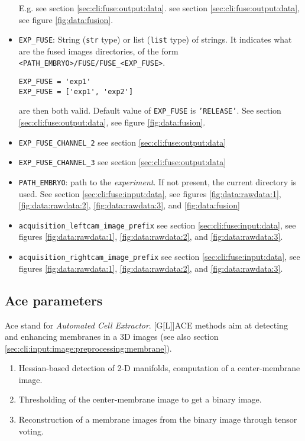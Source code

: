 \begin{itemize}
  E.g. see section \ref{sec:cli:fuse:output:data}.
see section \ref{sec:cli:fuse:output:data},
see figure \ref{fig:data:fusion}.
\item \texttt{EXP\_FUSE}:
  String (\texttt{str} type) or list (\texttt{list} type) of
  strings. It indicates what are the fused images directories, 
  of the form \texttt{<PATH\_EMBRYO>/FUSE/FUSE\_<EXP\_FUSE>}.
\begin{verbatim}
EXP_FUSE = 'exp1'
EXP_FUSE = ['exp1', 'exp2']
\end{verbatim}
  are then both valid. 
  Default value of \texttt{EXP\_FUSE} is \texttt{'RELEASE'}.
  See section \ref{sec:cli:fuse:output:data},
  see figure \ref{fig:data:fusion}.
\item \texttt{EXP\_FUSE\_CHANNEL\_2} 
see section \ref{sec:cli:fuse:output:data}
\item \texttt{EXP\_FUSE\_CHANNEL\_3} 
see section \ref{sec:cli:fuse:output:data}
\item \texttt{PATH\_EMBRYO}: 
  path to the \textit{experiment}.
  If not present, the current directory is used.
  See section \ref{sec:cli:fuse:input:data},
  see figures \ref{fig:data:rawdata:1}, 
\ref{fig:data:rawdata:2}, 
\ref{fig:data:rawdata:3}, and
\ref{fig:data:fusion}
\item \texttt{acquisition\_leftcam\_image\_prefix}  
see section \ref{sec:cli:fuse:input:data},
see figures \ref{fig:data:rawdata:1}, 
\ref{fig:data:rawdata:2}, 
and \ref{fig:data:rawdata:3}.
\item \texttt{acquisition\_rightcam\_image\_prefix}  
see section \ref{sec:cli:fuse:input:data},
see figures \ref{fig:data:rawdata:1}, 
\ref{fig:data:rawdata:2}, 
and \ref{fig:data:rawdata:3}.
\end{itemize}














\subsection{Ace parameters}
\label{sec:cli:parameters:ace}

Ace stand for \textit{Automated Cell Extractor}. [G[L]]ACE methods aim at detecting and enhancing membranes in a 3D images (see also section \ref{sec:cli:input:image:preprocessing:membrane}).
\begin{enumerate}
\itemsep -0.5ex
\item \label{it:ace:detection} Hessian-based detection of 2-D manifolds, computation of a center-membrane image.
\item \label{it:ace:thresholding} Thresholding of the center-membrane image to get a binary image.
\item \label{it:ace:tensor} Reconstruction of a membrane images from the binary image through tensor voting.
\end{enumerate}

